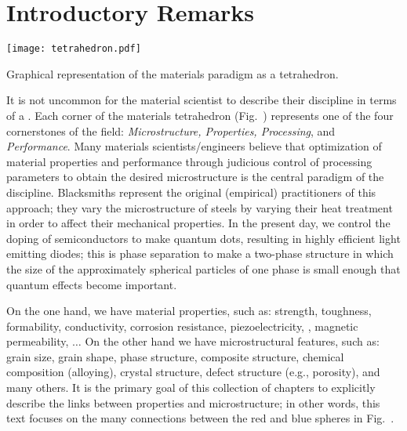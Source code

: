 \section{Introductory Remarks}

\begin{floatingfigure}[r]{3.2in}
\centering
{\texttt{[image: tetrahedron.pdf]}}
{\caption{\small Graphical representation of the materials paradigm as a tetrahedron.}}
\end{floatingfigure}
\noindent It is not uncommon for the material scientist to describe their discipline in terms of a .  Each corner of the materials tetrahedron (Fig.~) represents one of the four cornerstones of the field: \textit{Microstructure, Properties, Processing}, and \textit{Performance}. Many materials scientists/engineers believe that optimization of material properties and performance through judicious control of processing parameters to obtain the desired microstructure is the central paradigm of the discipline.  Blacksmiths represent the original (empirical) practitioners of this approach; they vary the microstructure of steels by varying their heat treatment in order to affect their mechanical properties.  In the present day, we control the doping of semiconductors to make quantum dots, resulting in highly efficient light emitting diodes; this is phase separation to make a two-phase structure in which the size of the approximately spherical particles of one phase is small enough that quantum effects become important.

On the one hand, we have material properties, such as: strength, toughness, formability, conductivity, corrosion resistance, piezoelectricity, , magnetic permeability, $\ldots$ On the other hand we have microstructural features, such as: grain size, grain shape, phase structure, composite structure, chemical composition (alloying), crystal structure, defect structure (e.g., porosity), and many others. It is the primary goal of this collection of chapters to explicitly describe the links between properties and microstructure; in other words, this text focuses on the many connections between the red and blue spheres in Fig.~.\\  

